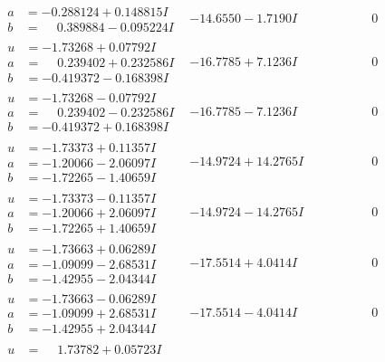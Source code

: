 \documentclass[1p]{elsarticle_modified}
\theoremstyle{definition}
\begin{document}
$$\begin{array}{c|c|c}
\begin{aligned}
a &= -0.288124 + 0.148815 I \\
b &= \phantom{-}0.389884 - 0.095224 I\end{aligned}
 & -14.6550 - 1.7190 I & \phantom{-0.000000 } 0 \\ \hline\begin{aligned}
u &= -1.73268 + 0.07792 I \\
a &= \phantom{-}0.239402 + 0.232586 I \\
b &= -0.419372 - 0.168398 I\end{aligned}
 & -16.7785 + 7.1236 I & \phantom{-0.000000 } 0 \\ \hline\begin{aligned}
u &= -1.73268 - 0.07792 I \\
a &= \phantom{-}0.239402 - 0.232586 I \\
b &= -0.419372 + 0.168398 I\end{aligned}
 & -16.7785 - 7.1236 I & \phantom{-0.000000 } 0 \\ \hline\begin{aligned}
u &= -1.73373 + 0.11357 I \\
a &= -1.20066 - 2.06097 I \\
b &= -1.72265 - 1.40659 I\end{aligned}
 & -14.9724 + 14.2765 I & \phantom{-0.000000 } 0 \\ \hline\begin{aligned}
u &= -1.73373 - 0.11357 I \\
a &= -1.20066 + 2.06097 I \\
b &= -1.72265 + 1.40659 I\end{aligned}
 & -14.9724 - 14.2765 I & \phantom{-0.000000 } 0 \\ \hline\begin{aligned}
u &= -1.73663 + 0.06289 I \\
a &= -1.09099 - 2.68531 I \\
b &= -1.42955 - 2.04344 I\end{aligned}
 & -17.5514 + 4.0414 I & \phantom{-0.000000 } 0 \\ \hline\begin{aligned}
u &= -1.73663 - 0.06289 I \\
a &= -1.09099 + 2.68531 I \\
b &= -1.42955 + 2.04344 I\end{aligned}
 & -17.5514 - 4.0414 I & \phantom{-0.000000 } 0 \\ \hline\begin{aligned}
u &= \phantom{-}1.73782 + 0.05723 I \\

\end{aligned}
\end{array}$$
\end{document}
